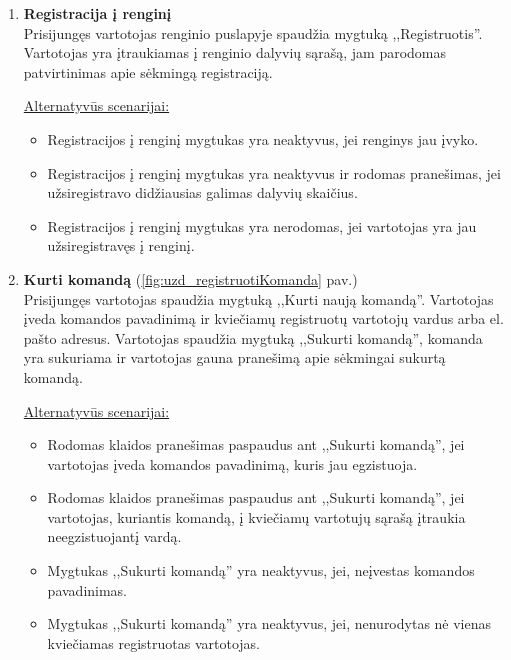 \documentclass{VUMIFPSkursinis}
\begin{document}
\begin{enumerate} [label = \textbf{U\arabic*.}]
				\underline{Alternatyvūs scenarijai:}
				\begin{itemize}
				\item Jei įrenginį bilietai nepardavinėjami arba organizatorius nenurodė bilietų pardavimo tinklalapio, mygtukas ,,Pirkti bilietus'' nerodomas.
				\item Bilietų nebėra į norimą renginį. Mygtukas ,,Pirkti bilietus'' tampa neaktyvus, ant jo užvedus pelyte rodomas pranešimas, kad bilietai išparduoti.
				\end{itemize}
				
			\item \textbf{Registracija į renginį} \\
					Prisijungęs vartotojas renginio puslapyje spaudžia mygtuką ,,Registruotis''. Vartotojas yra įtraukiamas į renginio dalyvių sąrašą, jam parodomas patvirtinimas apie sėkmingą registraciją.
					
				\underline{Alternatyvūs scenarijai:}
				\begin{itemize}
						\item Registracijos į renginį mygtukas yra neaktyvus, jei renginys jau įvyko.
						\item Registracijos į renginį mygtukas yra neaktyvus ir rodomas pranešimas, jei užsiregistravo didžiausias galimas dalyvių skaičius.
						\item Registracijos į renginį mygtukas yra nerodomas, jei vartotojas yra jau užsiregistravęs į renginį.
				\end{itemize}
				
			\item \textbf{Kurti komandą} (\ref{fig:uzd_registruotiKomanda} pav.)\\
				Prisijungęs vartotojas  spaudžia mygtuką ,,Kurti naują komandą''. Vartotojas įveda komandos pavadinimą ir kviečiamų registruotų vartotojų vardus arba el. pašto adresus. Vartotojas spaudžia mygtuką ,,Sukurti komandą'', komanda yra sukuriama ir vartotojas gauna pranešimą apie sėkmingai sukurtą komandą.
			
				\underline{Alternatyvūs scenarijai:}
				\begin{itemize}
					\item Rodomas klaidos pranešimas paspaudus ant ,,Sukurti komandą'', jei vartotojas įveda komandos pavadinimą, kuris jau egzistuoja.
					\item Rodomas klaidos pranešimas paspaudus ant ,,Sukurti komandą'', jei vartotojas, kuriantis komandą, į kviečiamų vartotujų sąrašą įtraukia neegzistuojantį vardą.
					\item Mygtukas ,,Sukurti komandą'' yra neaktyvus, jei, neįvestas komandos pavadinimas.
					\item Mygtukas ,,Sukurti komandą'' yra neaktyvus, jei, nenurodytas nė vienas kviečiamas registruotas vartotojas.
				\end{itemize}


\end{enumerate}
\end{document}
